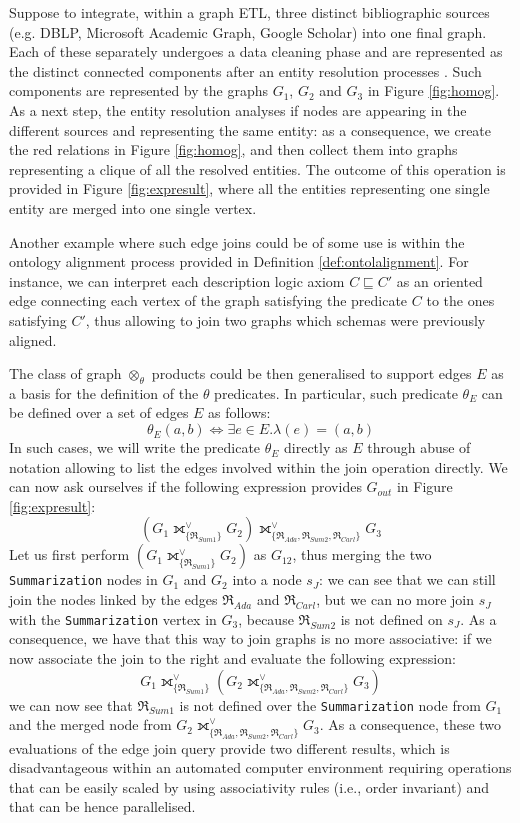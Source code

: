 \begin{example}
    Suppose to integrate, within a graph ETL, three distinct bibliographic sources (e.g. DBLP, Microsoft Academic Graph, Google Scholar) into one final graph. Each of these separately undergoes a data cleaning phase and are represented as the distinct connected components after an entity resolution processes \cite{markus}. Such components are represented by the graphs $G_1$, $G_2$ and $G_3$ in Figure \ref{fig:homog}.
As a next step, the entity resolution \cite{ALIEH17} analyses if nodes are appearing in the different sources and representing the same entity: as a consequence, we create the red relations in Figure \ref{fig:homog}, and then collect them into graphs representing a clique of all the resolved entities. The outcome of this operation is provided in Figure \vref{fig:expresult}, where all the entities representing one single entity are merged into one single vertex.
\end{example}

Another example where such edge joins could be of some use is within the ontology alignment process provided in Definition \vref{def:ontolalignment}. For instance, we can interpret each description logic axiom $C\sqsubseteq C'$ as an oriented edge connecting each vertex of the graph satisfying the predicate $C$ to the ones satisfying $C'$, thus allowing to join two graphs which schemas were previously aligned.

    The class of graph $\otimes_\theta$ products could be then generalised to support edges $E$ as a basis for the definition of the $\theta$ predicates. In particular, such predicate $\theta_E$ can be defined over a set of edges $E$ as follows:
	\[\theta_E(a,b)\Leftrightarrow \exists e\in E. \lambda(e)=(a,b)\]
	In such cases, we will write the predicate $\theta_E$ directly as $E$ through abuse of notation allowing to list the edges involved within the join operation directly. We can now ask ourselves if the following expression provides $G_{out}$ in Figure \ref{fig:expresult}:
\[(G_1\fullouterjoin^\vee_{\{\Re_{Sum1}\}}G_2)\fullouterjoin^\vee_{\{\Re_{Ada},\Re_{Sum2},\Re_{Carl}\}}G_3\]
	Let us first perform $(G_1\fullouterjoin^\vee_{\{\Re_{Sum1}\}}G_2)$ as $G_{12}$, thus merging the two \texttt{Summarization} nodes in $G_1$ and $G_2$ into a node $s_J$: we can see that we can still join the nodes linked by the edges $\Re_{Ada}$ and $\Re_{Carl}$, but we can no more join $s_J$ with the \texttt{Summarization} vertex in $G_3$, because $\Re_{Sum2}$ is not defined on $s_J$. As a consequence, we have that this way to join graphs is no more associative: if we now associate the join to the right and evaluate the following expression:
\[G_1\fullouterjoin^\vee_{\{\Re_{Sum1}\}}(G_2\fullouterjoin^\vee_{\{\Re_{Ada},\Re_{Sum2},\Re_{Carl}\}}G_3)\]
	we can now see that $\Re_{Sum1}$ is not defined over the \texttt{Summarization} node from $G_1$ and the merged node from $G_2\fullouterjoin^\vee_{\{\Re_{Ada},\Re_{Sum2},\Re_{Carl}\}}G_3$. As a consequence, these two evaluations of the edge join query provide two different results, which is disadvantageous within an automated computer environment requiring operations that can be easily scaled by using associativity rules (i.e., order invariant) and that can be hence parallelised.

